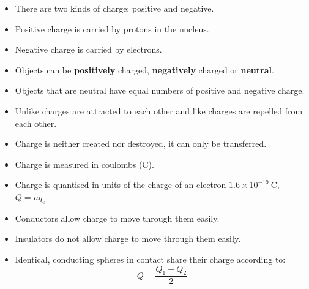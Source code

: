       \label{m38781*id201947}\begin{itemize}[noitemsep ] 
\item There are two kinds of charge: positive and negative.
\item Positive charge is carried by protons in the nucleus.
\item Negative charge is carried by electrons.
            \label{m38781*uid14}\item Objects can be \textbf{positively} charged, \textbf{negatively} charged or \textbf{neutral}.
\label{m38781*uid15}\item Objects that are neutral have equal numbers of positive and negative charge.

\label{m38781*uid16}\item Unlike charges are attracted to each other and like charges are repelled from each other.
\label{m38781*uid17}\item Charge is neither created nor destroyed, it can only be transferred.
\label{m38781*uid18}\item Charge is measured in coulombs (C).
\item Charge is quantised in units of the charge of an electron $1.6\times10^{-19}~\text{C}$, $Q=nq_{e}$. 
\label{m38781*uid19}\item Conductors allow charge to move through them easily.
\label{m38781*uid20}\item Insulators do not allow charge to move through them easily.
\item Identical, conducting spheres in contact share their charge according to:
\begin{equation*}
 Q=\frac{Q_1+Q_2}{2}
\end{equation*}
\end{itemize}


